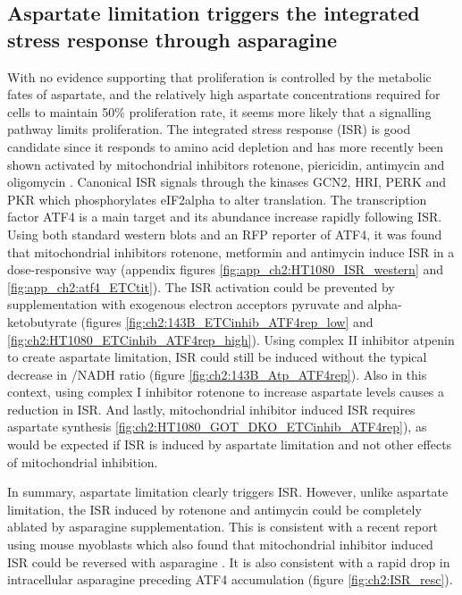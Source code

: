 \subsection{Aspartate limitation triggers the integrated stress response through asparagine}
With no evidence supporting that proliferation is controlled by the metabolic fates of aspartate, and the relatively high aspartate concentrations required for cells to maintain 50\% proliferation rate, it seems more likely that a signalling pathway limits proliferation.
The integrated stress response (ISR) is good candidate since it responds to amino acid depletion \cite{Darnell2018-lp} and has more recently been shown activated by mitochondrial inhibitors rotenone, piericidin, antimycin and oligomycin \cite{Guo2020-ia, Mick2020-kf, Condon2021-nz}.
Canonical ISR signals through the kinases GCN2, HRI, PERK and PKR which phosphorylates eIF2alpha to alter translation.
The transcription factor ATF4 is a main target and its abundance increase rapidly following ISR.
Using both standard western blots and an RFP reporter of ATF4, it was found that mitochondrial inhibitors rotenone, metformin and antimycin induce ISR in a dose-responsive way (appendix figures \ref{fig:app_ch2:HT1080_ISR_western} and \ref{fig:app_ch2:atf4_ETCtit}).
The ISR activation could be prevented by supplementation with exogenous electron acceptors pyruvate and alpha-ketobutyrate (figures \ref{fig:ch2:143B_ETCinhib_ATF4rep_low} and \ref{fig:ch2:HT1080_ETCinhib_ATF4rep_high}).
Using complex II inhibitor atpenin to create aspartate limitation, ISR could still be induced without the typical decrease in \NAD{}/NADH ratio (figure \ref{fig:ch2:143B_Atp_ATF4rep}).
Also in this context, using complex I inhibitor rotenone to increase aspartate levels \cite{Hart2023-gp} causes a reduction in ISR.
And lastly, mitochondrial inhibitor induced ISR requires aspartate synthesis \ref{fig:ch2:HT1080_GOT_DKO_ETCinhib_ATF4rep}), as would be expected if ISR is induced by aspartate limitation and not other effects of mitochondrial inhibition.

In summary, aspartate limitation clearly triggers ISR.
However, unlike aspartate limitation, the ISR induced by rotenone and antimycin could be completely ablated by asparagine supplementation.
This is consistent with a recent report using mouse myoblasts which also found that mitochondrial inhibitor induced ISR could be reversed with asparagine \cite{Mick2020-kf}.
It is also consistent with a rapid drop in intracellular asparagine preceding ATF4 accumulation (figure \ref{fig:ch2:ISR_resc}).

